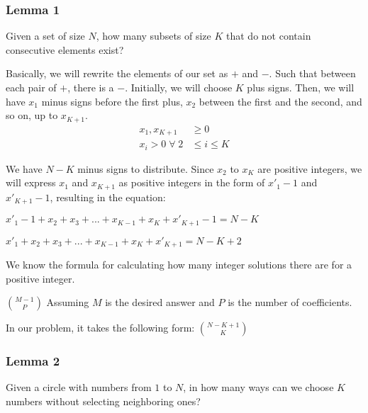             \subsubsection{Lemma 1}
                Given a set of size $N$, how many subsets of size $K$ that do not contain consecutive elements exist?
                
                Basically, we will rewrite the elements of our set as $+$ and $-$. Such that between each pair of $+$, there is a $-$. Initially, we will choose $K$ plus signs. Then, we will have $x_1$ minus signs before the first plus, $x_2$ between the first and the second, and so on, up to $x_{\scriptscriptstyle K+1}$.
                \begin{align*}
                    x_1, x_{\scriptscriptstyle K+1} &\ge 0\\
                    x_i > 0 \; \forall \; 2 &\le i \le K 
                \end{align*}
        
                We have $N-K$ minus signs to distribute. Since $x_2$ to $x_{\scriptscriptstyle K}$ are positive integers, we will express $x_1$ and $x_{\scriptscriptstyle K+1}$ as positive integers in the form of $x'_1-1$ and $x'_{\scriptscriptstyle K+1}-1$, resulting in the equation:
                
                
                $x'_1 - 1 + x_2 + x_3 + ... + x_{\scriptscriptstyle K-1} + x_{\scriptscriptstyle K} + x'_{\scriptscriptstyle K+1}-1 = N-K$
        
                $x'_1 + x_2 + x_3 + ... + x_{\scriptscriptstyle K-1} + x_{\scriptscriptstyle K} + x'_{\scriptscriptstyle K+1} = N - K + 2$
        
                
                We know the formula for calculating how many integer solutions there are for a positive integer.
        
                $\binom{M-1}{P}$ Assuming $M$ is the desired answer and $P$ is the number of coefficients.
        
                In our problem, it takes the following form: $\binom{N-K+1}{K}$
    
            \subsubsection{Lemma 2}
            Given a circle with numbers from $1$ to $N$, in how many ways can we choose $K$ numbers without selecting neighboring ones?

